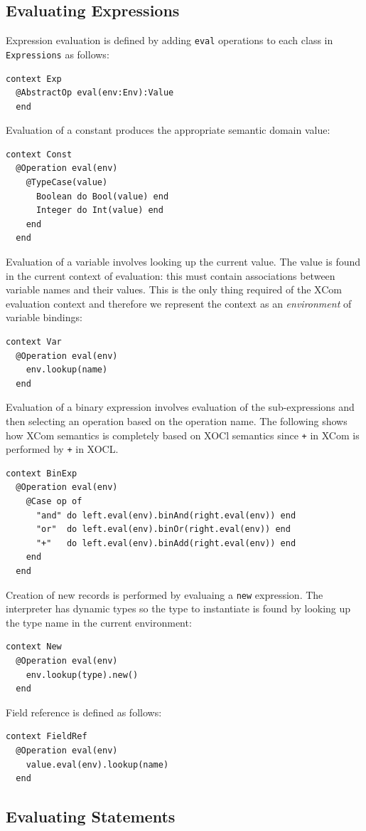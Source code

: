 \documentclass{article}
\begin{document}
\subsection{Evaluating Expressions}
Expression evaluation is defined by adding {\tt eval} operations to each class
in {\tt Expressions} as follows:
\begin{verbatim}
context Exp 
  @AbstractOp eval(env:Env):Value
  end
\end{verbatim}
Evaluation of a constant produces the appropriate semantic domain value:
\begin{verbatim}
context Const
  @Operation eval(env)
    @TypeCase(value)
      Boolean do Bool(value) end
      Integer do Int(value) end
    end
  end
\end{verbatim}
Evaluation of a variable involves looking up the current value. The value is found in the
current context of evaluation: this must contain associations between variable names and 
their values. This is the only thing required of the XCom evaluation context and therefore
we represent the context as an {\em environment} of variable bindings:
\begin{verbatim}
context Var
  @Operation eval(env)
    env.lookup(name)
  end
\end{verbatim}
Evaluation of a binary expression involves evaluation of the sub-expressions and then
selecting an operation based on the operation name. The following shows how XCom semantics
is completely based on XOCl semantics since {\tt +} in XCom is performed by {\tt +} in XOCL.
\begin{verbatim}
context BinExp
  @Operation eval(env)
    @Case op of
      "and" do left.eval(env).binAnd(right.eval(env)) end
      "or"  do left.eval(env).binOr(right.eval(env)) end
      "+"   do left.eval(env).binAdd(right.eval(env)) end
    end
  end
\end{verbatim}
Creation of new records is performed by evaluaing a {\tt new} expression. The interpreter has
dynamic types so the type to instantiate is found by looking up the type name in the current 
environment:
\begin{verbatim}
context New
  @Operation eval(env)
    env.lookup(type).new()
  end
\end{verbatim}
Field reference is defined as follows:
\begin{verbatim}
context FieldRef
  @Operation eval(env)
    value.eval(env).lookup(name)
  end
\end{verbatim}

\subsection{Evaluating Statements}
\end{document}
